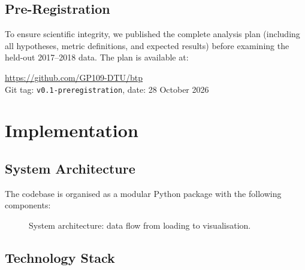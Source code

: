 \documentclass[12pt, a4paper, oneside]{report}
\theoremstyle{definition}
\begin{document}
\section{Pre-Registration}

To ensure scientific integrity, we published the complete analysis plan
(including all hypotheses, metric definitions, and expected results) before
examining the held-out 2017--2018 data.  The plan is available at:
\begin{center}
  \url{https://github.com/GP109-DTU/btp}\\
  Git tag: \texttt{v0.1-preregistration}, date: 28 October 2026
\end{center}

\chapter{Implementation}
\label{chap:implementation}


\section{System Architecture}

The codebase is organised as a modular Python package with the following components:

\begin{figure}[htbp]
  \centering
  \caption{System architecture: data flow from loading to visualisation.}
  \label{fig:architecture}
\end{figure}

\section{Technology Stack}
\end{document}
